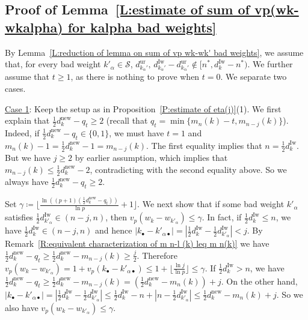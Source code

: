 \documentclass[12pt]{amsart}
\theoremstyle{definition}
\numberwithin{equation}{subsection}
\def\calS{\mathcal{S}}
\newcommand{\new}{\mathrm{new}}
\newcommand{\Iw}{\mathrm{Iw}}
\newcommand{\ur}{\mathrm{ur}}
\begin{document}
\subsection{Proof of Lemma~\ref{L:estimate of sum of vp(wk-wkalpha) for kalpha bad weights}}
\label{S:proof of estimate of sum of vp(wk-wkalpha)}
By Lemma~\ref{L:reduction of lemma on sum of vp wk-wk' bad weights}, we assume that, for every bad weight $k'_\alpha \in \calS$, $d_{k_\alpha'}^\ur, \, d_{k_\alpha'}^\Iw-d_{k_\alpha'}^\ur \notin [n^\ast,d_k^\Iw-n^\ast)$. We further assume that $t \geq 1$, as there is nothing to prove when $t=0$. We separate two cases.

\smallskip
\underline{Case 1}: Keep the setup as in Proposition~\ref{P:estimate of eta(j)}(1). 
We first explain that $\tfrac 12 d_k^\new -q_t\geq 2$ (recall that $q_t = \min\{m_n(k)-t, m_{n-j}(k)\}$). Indeed, if $\tfrac 12 d_k^\new-q_t \in \{0, 1\}$, we must have $t=1$ and $m_n(k) -1  = \tfrac 12 d_k^\new -1= m_{n-j}(k)$. The first equality implies that $n =\frac 12 d_k^\Iw$.  But we have $j\geq 2$ by earlier assumption, which implies that $m_{n-j}(k) \leq \tfrac 12 d_k^\new -2$, contradicting with the second equality above. So we always have  $\tfrac 12 d_k^\new -q_t\geq 2$.

Set $\gamma\coloneqq \big\lfloor \frac{\ln ((p+1)(\frac 12 d_k^\new-q_t))}{\ln p}+1 \big\rfloor$. We next show that if some bad weight $k'_\alpha$ satisfies $\frac 12 d_{k'_\alpha}^\Iw\in (n-j,n)$, then $v_p(w_k-w_{k'_\alpha})\leq \gamma$. In fact, if $\frac 12 d_k^\Iw\leq n$, we have $\frac 12 d_k^\Iw\in (n-j,n)$ and hence $|k_\bullet-k'_{\alpha\bullet}|=|\frac 12 d_k^\Iw-\frac 12 d_{k'_\alpha}^\Iw|<j$. By Remark~\ref{R:equivalent characterization of m n-l (k) leq m n(k)} we have $\frac 12 d_k^\new-q_t\geq \frac 12 d_k^\new -m_{n-j}(k)\geq \frac j2$. Therefore $v_p(w_k-w_{k'_\alpha})=1+v_p(k_\bullet-k'_{\alpha\bullet})\leq 1+\lfloor \frac{\ln j}{\ln p} \rfloor\leq \gamma$. If $\frac 12 d_k^\Iw>n$, we have 
$\frac 12d_k^\new -q_t \geq \frac 12d_k^\new - m_{n-j}(k) = (\frac 12d_k^\new-m_n(k))+j$.  On the other hand, $|k_\bullet -k'_{\alpha\bullet}|=|\frac 12 d_k^\Iw-\frac 12 d_{k'_\alpha}^\Iw|\leq \frac 12 d_k^\Iw-n+|n-\frac 12 d_{k'_\alpha}^\Iw|\leq \frac 12 d_k^\new -m_n(k)+j$. So we also have $v_p(w_k-w_{k'_\alpha})\leq \gamma$.
\end{document}
